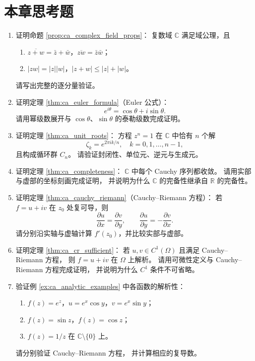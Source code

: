 \clearpage

\section*{本章思考题}

\begin{enumerate}[leftmargin=3em, label=\textbf{题 \arabic*}]

    \item 证明命题 \ref{prop:ca_complex_field_props}：
    复数域 $\mathbb{C}$ 满足域公理，且
    \begin{enumerate}[label=(\roman*)]
        \item $\overline{z+w}=\bar{z}+\bar{w}$，$\overline{zw}=\bar{z}\bar{w}$；
        \item $|zw|=|z||w|$，$|z+w|\le|z|+|w|$。
    \end{enumerate}
    请写出完整的逐分量验证。

    \item 证明定理 \ref{thm:ca_euler_formula}（Euler 公式）：
    \[
    e^{i\theta}=\cos\theta+i\sin\theta.
    \]
    请用幂级数展开与 $\cos\theta$、$\sin\theta$ 的泰勒级数完成证明。

    \item 证明定理 \ref{thm:ca_unit_roots}：
    方程 $z^n=1$ 在 $\mathbb{C}$ 中恰有 $n$ 个解
    \[
    \zeta_k=e^{2\pi ik/n},\quad k=0,1,\dots,n-1,
    \]
    且构成循环群 $C_n$。
    请验证封闭性、单位元、逆元与生成元。

    \item 证明定理 \ref{thm:ca_completeness}：
    $\mathbb{C}$ 中每个 Cauchy 序列都收敛。
    请用实部与虚部的坐标刻画完成证明，
    并说明为什么 $\mathbb{C}$ 的完备性继承自 $\mathbb{R}$ 的完备性。

    \item 证明定理 \ref{thm:ca_cauchy_riemann}（Cauchy--Riemann 方程）：
    若 $f=u+iv$ 在 $z_0$ 处复可导，则
    \[
    \frac{\partial u}{\partial x}=\frac{\partial v}{\partial y},\qquad
    \frac{\partial u}{\partial y}=-\frac{\partial v}{\partial x}.
    \]
    请分别沿实轴与虚轴计算 $f'(z_0)$，并比较实部与虚部。

    \item 证明定理 \ref{thm:ca_cr_sufficient}：
    若 $u,v\in C^1(\Omega)$ 且满足 Cauchy--Riemann 方程，
    则 $f=u+iv$ 在 $\Omega$ 上解析。
    请用可微性定义与 Cauchy--Riemann 方程完成证明，
    并说明为什么 $C^1$ 条件不可省略。

    \item 验证例 \ref{ex:ca_analytic_examples} 中各函数的解析性：
    \begin{enumerate}[label=(\roman*)]
        \item $f(z)=e^z$，$u=e^x\cos y$，$v=e^x\sin y$；
        \item $f(z)=\sin z$，$f(z)=\cos z$；
        \item $f(z)=1/z$ 在 $\mathbb{C}\setminus\{0\}$ 上。
    \end{enumerate}
    请分别验证 Cauchy--Riemann 方程，
    并计算相应的复导数。


\end{enumerate}

